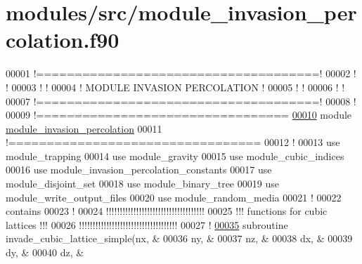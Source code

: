 \hypertarget{module__invasion__percolation_8f90_source}{
\section{modules/src/module\-\_\-invasion\-\_\-percolation.f90}
}

\begin{DoxyCode}
00001 \textcolor{comment}{!=====================================!}
00002 \textcolor{comment}{!                                     !}
00003 \textcolor{comment}{!                                     !}
00004 \textcolor{comment}{!     MODULE INVASION PERCOLATION     !}
00005 \textcolor{comment}{!                                     ! }
00006 \textcolor{comment}{!                                     !}
00007 \textcolor{comment}{!=====================================!}
00008 \textcolor{comment}{!}
00009 \textcolor{comment}{!=================================}
\hypertarget{module__invasion__percolation_8f90_source_l00010}{}\hyperlink{classmodule__invasion__percolation}{00010} \textcolor{keyword}{module} \hyperlink{classmodule__invasion__percolation}{module_invasion_percolation}
00011 \textcolor{comment}{!=================================}
00012   \textcolor{comment}{!}
00013   use \textcolor{keywordflow}{module\_trapping}
00014   use \textcolor{keywordflow}{module\_gravity}
00015   use \textcolor{keywordflow}{module\_cubic\_indices}
00016   use \textcolor{keywordflow}{module\_invasion\_percolation\_constants}
00017   use \textcolor{keywordflow}{module\_disjoint\_set}
00018   use \textcolor{keywordflow}{module\_binary\_tree}
00019   use \textcolor{keywordflow}{module\_write\_output\_files}
00020   use \textcolor{keywordflow}{module\_random\_media}
00021   \textcolor{comment}{!}
00022 \textcolor{keyword}{contains}
00023   \textcolor{comment}{!}
00024 \textcolor{comment}{!!!!!!!!!!!!!!!!!!!!!!!!!!!!!!!!!!!!}
00025 \textcolor{comment}{!!! functions for cubic lattices !!!}
00026 \textcolor{comment}{!!!!!!!!!!!!!!!!!!!!!!!!!!!!!!!!!!!!}
00027   \textcolor{comment}{!}
\hypertarget{module__invasion__percolation_8f90_source_l00035}{}\hyperlink{classmodule__invasion__percolation_a9249417bedcee0cd28dc65eba16868bd}{00035}   \textcolor{keyword}{subroutine }invade\_cubic\_lattice\_simple(nx,              &
00036                                          ny,              &
00037                                          nz,              &
00038                                          dx,              &
00039                                          dy,              &
00040                                          dz,              &

\end{DoxyCode}
